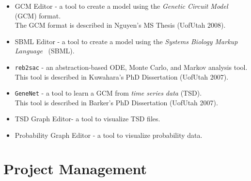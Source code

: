 \documentclass[titlepage,11pt]{article}
\begin{document}
\begin{itemize}
\item GCM Editor - a tool to create a model using the 
\emph{Genetic Circuit Model} (GCM) format.\\ 
The GCM format is described in
Nguyen's MS Thesis
(UofUtah 2008).
\item SBML Editor - a tool to create a model using the 
\emph{Systems Biology Markup Language}
~(SBML). 
\item {\tt reb2sac} - an abstraction-based ODE, Monte Carlo, and Markov analysis tool.
\\
This tool is described in 
Kuwahara's PhD Dissertation
(UofUtah 2007).
\item {\tt GeneNet} - a tool to learn a GCM from \emph{time series
    data} (TSD).\\
This tool is described in 
Barker's PhD Dissertation
(UofUtah 2007).
\item TSD Graph Editor- a tool to visualize TSD files. 
\item Probability Graph Editor - a tool to visualize probability data. 
\end{itemize}

\section{Project Management}
\end{document}
